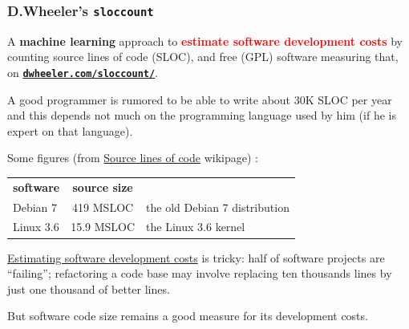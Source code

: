 \documentclass[xcolor=svgnames,final,smaller,a4]{beamer}
\begin{document}
 \begin{frame}
   \frametitle{D.Wheeler's \texttt{sloccount}}

 A \textbf{machine learning} approach to \textbf{\textcolor{red}{estimate software development costs}} by
 counting source lines of code (SLOC), and free (GPL) software
 measuring that, on
 \href{https://dwheeler.com/sloccount/}{\textbf{\texttt{dwheeler.com/sloccount/}}}.

 A good programmer is rumored to be able to write about 30K SLOC per
 year and this depends not much on the programming language used by
 him (if he is expert on that language).
 \medskip
 

 Some figures (from \href{https://en.wikipedia.org/wiki/Source_lines_of_code}{Source lines of code} wikipage) :
 \begin{tabular}{lcp{}}
   \textbf{software} & \textbf{source size} & \\
   Debian 7 & 419 MSLOC & the old Debian 7 distribution \\
   Linux 3.6 & 15.9 MSLOC & the Linux 3.6 kernel \\
 \end{tabular}

 \bigskip
 
\href{https://en.wikipedia.org/wiki/Software_development_effort_estimation}{Estimating
  software development costs} is tricky: half of software projects are
``failing''; refactoring a code base may involve replacing ten
thousands lines by just one thousand of better lines.

\medskip

But software code size remains a good measure for its development
costs.
 \end{frame}
\end{document}
